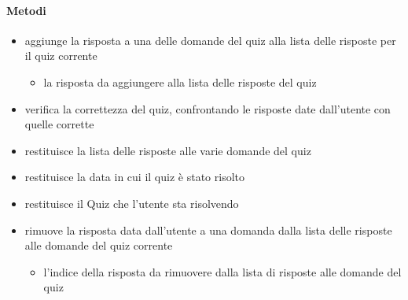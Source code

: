 \paragraph{Metodi}
\begin{itemize}
\item {}
\newline
aggiunge la risposta a una delle domande del quiz alla lista delle risposte per il quiz corrente
\newline
{}
\newline
\begin{itemize}
\item {}
\newline
la risposta da aggiungere alla lista delle risposte del quiz
\end{itemize}
\item {}
\newline
verifica la correttezza del quiz, confrontando le risposte date dall'utente con quelle corrette
\newline
\item {}
\newline
restituisce la lista delle risposte alle varie domande del quiz
\newline
\item {}
\newline
restituisce la data in cui il quiz è stato risolto
\newline
\item {}
\newline
restituisce il Quiz che l'utente sta risolvendo
\newline
\item {}
\newline
rimuove la risposta data dall'utente a una domanda dalla lista delle risposte alle domande del quiz corrente
\newline
{}
\newline
\begin{itemize}
\item {}
\newline
l'indice della risposta da rimuovere dalla lista di risposte alle domande del quiz
\end{itemize}
\end{itemize}
